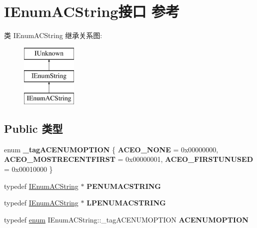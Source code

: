 \hypertarget{interface_i_enum_a_c_string}{}\section{I\+Enum\+A\+C\+String接口 参考}
\label{interface_i_enum_a_c_string}
类 I\+Enum\+A\+C\+String 继承关系图\+:\begin{figure}[H]
\begin{center}
\leavevmode
\includegraphics[height=3.000000cm]{interface_i_enum_a_c_string}
\end{center}
\end{figure}
\subsection*{Public 类型}
\begin{DoxyCompactItemize}
\item 
\mbox{\label{interface_i_enum_a_c_string_a7097b69a0f7e2c32dbfbad11ffaff41a}} 
enum {\bfseries \+\_\+tag\+A\+C\+E\+N\+U\+M\+O\+P\+T\+I\+ON} \{ {\bfseries A\+C\+E\+O\+\_\+\+N\+O\+NE} = 0x00000000, 
{\bfseries A\+C\+E\+O\+\_\+\+M\+O\+S\+T\+R\+E\+C\+E\+N\+T\+F\+I\+R\+ST} = 0x00000001, 
{\bfseries A\+C\+E\+O\+\_\+\+F\+I\+R\+S\+T\+U\+N\+U\+S\+ED} = 0x00010000
 \}
\item 
\mbox{\label{interface_i_enum_a_c_string_a5348eabf562ecffeeecd5af120906e23}} 
typedef \hyperlink{interface_i_enum_a_c_string}{I\+Enum\+A\+C\+String} $\ast$ {\bfseries P\+E\+N\+U\+M\+A\+C\+S\+T\+R\+I\+NG}
\item 
\mbox{\label{interface_i_enum_a_c_string_a236b400e7a50d59edb8c0f4413c55704}} 
typedef \hyperlink{interface_i_enum_a_c_string}{I\+Enum\+A\+C\+String} $\ast$ {\bfseries L\+P\+E\+N\+U\+M\+A\+C\+S\+T\+R\+I\+NG}
\item 
\mbox{\label{interface_i_enum_a_c_string_acfd171b0e46118e2e7757eb9b1715c37}} 
typedef \hyperlink{interfaceenum}{enum} I\+Enum\+A\+C\+String\+::\+\_\+tag\+A\+C\+E\+N\+U\+M\+O\+P\+T\+I\+ON {\bfseries A\+C\+E\+N\+U\+M\+O\+P\+T\+I\+ON}
\end{DoxyCompactItemize}
